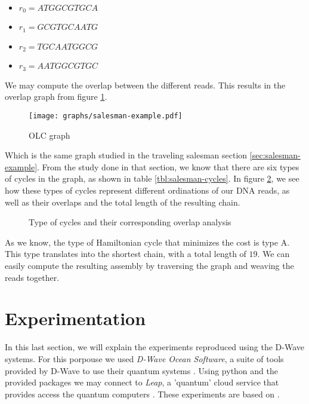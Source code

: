 \begin{itemize}
	\item $r_0 = ATGGCGTGCA$
	\item $r_1 = GCGTGCAATG$
	\item $r_2 = TGCAATGGCG$
	\item $r_3 = AATGGCGTGC$
\end{itemize}

We may compute the overlap between the different reads. This results in the overlap graph from figure \ref{fig:overlap-graph}.

\begin{figure}[h]
	\texttt{[image: graphs/salesman-example.pdf]}
	\centering
	\caption{OLC graph}
	\label{fig:overlap-graph}
\end{figure}

Which is the same graph studied in the traveling salesman section \ref{sec:salesman-example}. From the study done in that section, we know that there are six types of cycles in the graph, as shown in table \ref{tbl:salesman-cycles}. In figure \ref{fig:overlap-cycles}, we see how these types of cycles represent different ordinations of our DNA reads, as well as their overlaps and the total length of the resulting chain.

\begin{figure}[h]
	\centering
	\caption{Type of cycles and their corresponding overlap analysis \cite{Sarkar2020}}
	\label{fig:overlap-cycles}
\end{figure}

As we know, the type of Hamiltonian cycle that minimizes the cost is type A. This type translates into the shortest chain, with a total length of $19$. We can easily compute the resulting assembly by traversing the graph and weaving the reads together.


\section{Experimentation}


In this last section, we will explain the experiments reproduced using the D-Wave systems. For this porpouse we used \emph{D-Wave Ocean Software}, a suite of tools provided by D-Wave to use their quantum systems \cite{DWave-OceanDoc}. Using python and the provided packages we may connect to \emph{Leap}, a 'quantum' cloud service that provides access the quantum computers \cite{DWave-Leap}. These experiments are based on \cite{Sarkar2020}.


